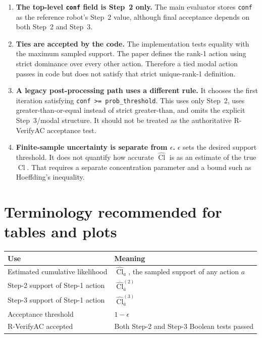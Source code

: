 \documentclass[11pt,a4paper]{article}
\newcommand{\Cl}{\operatorname{Cl}}
\begin{document}
\begin{enumerate}
    \item \textbf{The top-level \texttt{conf} field is Step~2 only.}
    The main evaluator stores \texttt{conf} as the reference robot's Step~2
    value, although final acceptance depends on both Step~2 and Step~3.

    \item \textbf{Ties are accepted by the code.}
    The implementation tests equality with the maximum sampled support.  The
    paper defines the rank-1 action using strict dominance over every other
    action.  Therefore a tied modal action passes in code but does not satisfy
    that strict unique-rank-1 definition.

    \item \textbf{A legacy post-processing path uses a different rule.}
    It chooses the first iteration satisfying
    \texttt{conf >= prob\_threshold}.  This uses only Step~2, uses
    greater-than-or-equal instead of strict greater-than, and omits the explicit
    Step~3/modal structure.  It should not be treated as the authoritative
    R-VerifyAC acceptance test.

    \item \textbf{Finite-sample uncertainty is separate from $\epsilon$.}
    $\epsilon$ sets the desired support threshold.  It does not quantify how
    accurate $\widehat{\Cl}$ is as an estimate of the true $\Cl$.  That requires
    a separate concentration parameter and a bound such as Hoeffding's
    inequality.
\end{enumerate}

\section{Terminology recommended for tables and plots}

\begin{center}
\begin{tabular}{>{\raggedright\arraybackslash}p{}
                >{\raggedright\arraybackslash}p{}}
\toprule
Use & Meaning \\
\midrule
Estimated cumulative likelihood & $\widehat{\Cl}_a$, the sampled support of any action $a$ \\
Step-2 support of Step-1 action & $\widehat{\Cl}^{(2)}_{\bar a}$ \\
Step-3 support of Step-1 action & $\widehat{\Cl}^{(3)}_{\bar a}$ \\
Acceptance threshold & $1-\epsilon$ \\
R-VerifyAC accepted & Both Step-2 and Step-3 Boolean tests passed \\
\bottomrule
\end{tabular}
\end{center}
\end{document}
